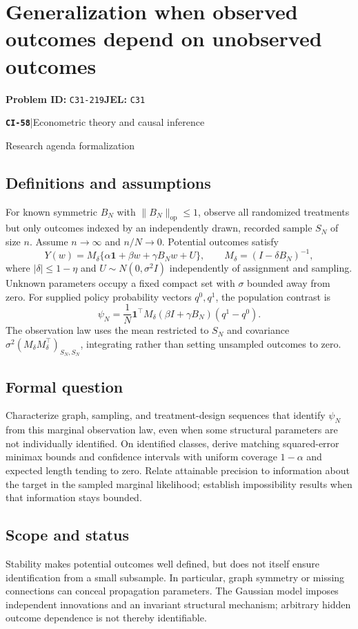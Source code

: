 \documentclass[11pt,a4paper]{article}
\newcommand{\entrymeta}[3]{{\sffamily\small\color{muted}\textbf{\texttt{#1}}\quad|\quad #2\par #3\par}}
\begin{document}
\section*{Generalization when observed outcomes depend on unobserved outcomes}
\textbf{Problem ID:} \texttt{C31-219}\quad \textbf{JEL:} \texttt{C31}\par
\label{problem:OP-0537}
\label{beyond:CI-58}
\entrymeta{CI-58}{Econometric theory and causal inference}{Research agenda formalization}
\subsection*{Definitions and assumptions}
For known symmetric $B_N$ with $\|B_N\|_{\mathrm{op}}\leq1$, observe all randomized treatments but only outcomes indexed by an independently drawn, recorded sample $S_N$ of size $n$. Assume $n\to\infty$ and $n/N\to0$. Potential outcomes satisfy
\[
 Y(w)=M_\delta\{\alpha\mathbf1+\beta w+\gamma B_Nw+U\},
 \qquad M_\delta=(I-\delta B_N)^{-1},
\]
where $|\delta|\leq1-\eta$ and $U\sim N(0,\sigma^2 I)$ independently of assignment and sampling. Unknown parameters occupy a fixed compact set with $\sigma$ bounded away from zero. For supplied policy probability vectors $q^0,q^1$, the population contrast is
\[
 \psi_N=\frac1N\mathbf1^\top
 M_\delta(\beta I+\gamma B_N)(q^1-q^0).
\]
The observation law uses the mean restricted to $S_N$ and covariance $\sigma^2(M_\delta M_\delta^\top)_{S_N,S_N}$, integrating rather than setting unsampled outcomes to zero.
\subsection*{Formal question}
Characterize graph, sampling, and treatment-design sequences that identify $\psi_N$ from this marginal observation law, even when some structural parameters are not individually identified. On identified classes, derive matching squared-error minimax bounds and confidence intervals with uniform coverage $1-\alpha$ and expected length tending to zero. Relate attainable precision to information about the target in the sampled marginal likelihood; establish impossibility results when that information stays bounded.
\subsection*{Scope and status}
Stability makes potential outcomes well defined, but does not itself ensure identification from a small subsample. In particular, graph symmetry or missing connections can conceal propagation parameters. The Gaussian model imposes independent innovations and an invariant structural mechanism; arbitrary hidden outcome dependence is not thereby identifiable.
\end{document}
